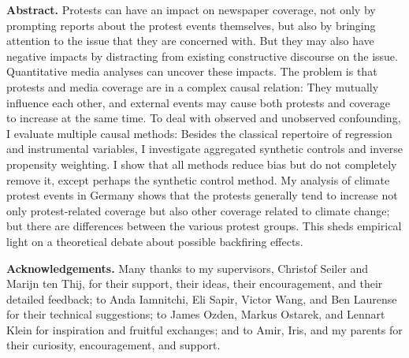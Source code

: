 \textbf{Abstract.} Protests can have an impact on newspaper coverage, not only by prompting reports about the protest events themselves, but also by bringing attention to the issue that they are concerned with. But they may also have negative impacts by distracting from existing constructive discourse on the issue. Quantitative media analyses can uncover these impacts. The problem is that protests and media coverage are in a complex causal relation: They mutually influence each other, and external events may cause both protests and coverage to increase at the same time. To deal with observed and unobserved confounding, I evaluate multiple causal methods: Besides the classical repertoire of regression and instrumental variables, I investigate aggregated synthetic controls and inverse propensity weighting. I show that all methods reduce bias but do not completely remove it, except perhaps the synthetic control method. My analysis of climate protest events in Germany shows that the protests generally tend to increase not only protest-related coverage but also other coverage related to climate change; but there are differences between the various protest groups. This sheds empirical light on a theoretical debate about possible backfiring effects.

\textbf{Acknowledgements.} Many thanks to my supervisors, Christof Seiler and Marijn ten Thij, for their support, their ideas, their encouragement, and their detailed feedback; to Anda Iamnitchi, Eli Sapir, Victor Wang, and Ben Laurense for their technical suggestions; to James Ozden, Markus Ostarek, and Lennart Klein for inspiration and fruitful exchanges; and to Amir, Iris, and my parents for their curiosity, encouragement, and support.

\newpage
